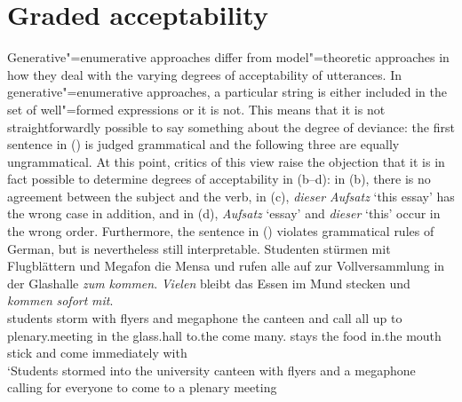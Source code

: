 \section{Graded acceptability}

Generative"=enumerative approaches differ from model"=theoretic approaches in how they deal with the varying degrees of acceptability
of utterances. In generative"=enumerative approaches, a particular string is either included in the set of well"=formed expressions or it is not.
This means that it is not straightforwardly possible to say something about the degree of deviance: the first sentence in () is judged grammatical
and the following three are equally ungrammatical.
\eal
{}
\zl
At this point, critics of this view raise the objection that it is in fact possible to determine degrees of acceptability
in (b--d): in (b), there is no agreement between the subject and the verb, in
(c),  \emph{dieser Aufsatz} `this essay'  has the wrong case in addition, and in (d),
\emph{Aufsatz} `essay' and \emph{dieser} `this' occur in the wrong order. Furthermore,
 the sentence in () violates grammatical rules of German, but is nevertheless still interpretable.
\ea
\gll Studenten stürmen mit Flugblättern und Megafon die Mensa und rufen alle auf zur Vollversammlung in der Glashalle \emph{zum} \emph{kommen}. \emph{Vielen} bleibt das Essen im Mund stecken und \emph{kommen} \emph{sofort} \emph{mit}.\footnotemark\\
students storm with flyers and megaphone the canteen and call all up to plenary.meeting in the glass.hall to.the come many.\dat{} stays the food in.the mouth stick and come immediately with\\
\glt `Students stormed into the university canteen with flyers and a megaphone calling for everyone to come to a plenary meeting
